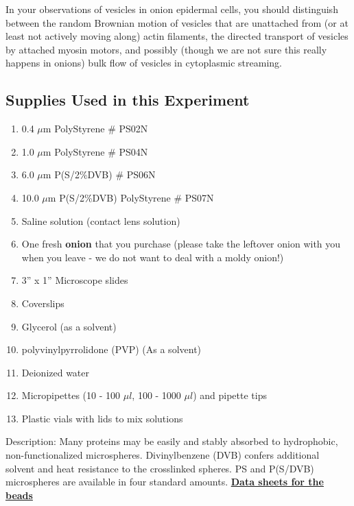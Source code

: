 \documentclass{../lab}
\begin{document}
In your observations of vesicles in onion epidermal cells, you should distinguish between the random Brownian motion of vesicles that are unattached from (or at least not actively moving along) actin filaments, the directed transport of vesicles by attached myosin motors, and possibly (though we are not sure this really happens in onions) bulk flow of vesicles in cytoplasmic streaming.

\subsection{Supplies Used in this Experiment}

\begin{enumerate}
    \item 0.4 $\mu$m PolyStyrene \# PS02N

    \item 1.0 $\mu$m PolyStyrene \# PS04N

    \item 6.0 $\mu$m P(S/2\%DVB) \# PS06N

    \item 10.0 $\mu$m P(S/2\%DVB) PolyStyrene \# PS07N

    \item Saline solution (contact lens solution)

    \item One fresh \textbf{onion} that you purchase (please take the leftover onion with you when you leave - we do not want to deal with a moldy onion!)

    \item 3'' x 1'' Microscope slides

    \item Coverslips

    \item Glycerol (as a solvent)

    \item polyvinylpyrrolidone (PVP) (As a solvent)

    \item Deionized water

    \item Micropipettes (10 - 100 $\mu l$, 100 - 1000 $\mu l$) and pipette tips

    \item Plastic vials with lids to mix solutions

\end{enumerate}

Description: Many proteins may be easily and stably absorbed to hydrophobic, non-functionalized microspheres. Divinylbenzene (DVB) confers additional solvent and heat resistance to the crosslinked spheres. PS and P(S/DVB) microspheres are available in four standard amounts. \href{https://drive.google.com/file/d/14BP0-c-ARC6TFctkikj5hvQLsU9uiVBw/view?usp=drive_link}{\textbf{Data sheets for the beads}} \\
\end{document}
